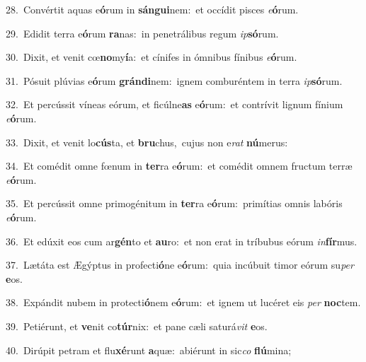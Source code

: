 {\numbfont\textcolor{\numbcolor}{28.}}~Convértit aquas e\-\textbf{ó}\-rum in \textbf{sán}\-\textbf{gui}nem:~\star et occídit pisces \textit{e}\-\textbf{ó}rum.\par
{\numbfont\textcolor{\numbcolor}{29.}}~Edidit terra e\-\textbf{ó}\-rum \textbf{ra}\-nas:~\star in penetrálibus regum \textit{ip}\-\textbf{só}rum.\par
{\numbfont\textcolor{\numbcolor}{30.}}~Dixit, et venit cœ\-\textbf{no}\-my\-\textbf{í}\-a:~\star et cínifes in ómnibus fínibus \textit{e}\-\textbf{ó}rum.\par
{\numbfont\textcolor{\numbcolor}{31.}}~Pósuit plúvias e\-\textbf{ó}\-rum \textbf{grán}\-\textbf{di}nem:~\star ignem comburéntem in terra \textit{ip}\-\textbf{só}rum.\par
{\numbfont\textcolor{\numbcolor}{32.}}~Et percússit víneas eórum, et ficúlne\textbf{as} e\-\textbf{ó}\-rum:~\star et contrívit lignum fínium \textit{e}\-\textbf{ó}rum.\par
{\numbfont\textcolor{\numbcolor}{33.}}~Dixit, et venit lo\-\textbf{cús}\-ta, et \textbf{bru}\-chus,~\star cujus non e\textit{rat} \textbf{nú}\-merus:\par
{\numbfont\textcolor{\numbcolor}{34.}}~Et comédit omne fœnum in \textbf{ter}\-ra e\-\textbf{ó}\-rum:~\star et comédit omnem fructum terræ \textit{e}\-\textbf{ó}rum.\par
{\numbfont\textcolor{\numbcolor}{35.}}~Et percússit omne primogénitum in \textbf{ter}\-ra e\-\textbf{ó}\-rum:~\star primítias omnis labóris \textit{e}\-\textbf{ó}rum.\par
{\numbfont\textcolor{\numbcolor}{36.}}~Et edúxit eos cum ar\-\textbf{gén}\-to et \textbf{au}\-ro:~\star et non erat in tríbubus eórum \textit{in}\-\textbf{fír}mus.\par
{\numbfont\textcolor{\numbcolor}{37.}}~Lætáta est Ægýptus in profecti\-\textbf{ó}\-ne e\-\textbf{ó}\-rum:~\star quia incúbuit timor eórum su\textit{per} \textbf{e}\-os.\par
{\numbfont\textcolor{\numbcolor}{38.}}~Expándit nubem in protecti\-\textbf{ó}\-nem e\-\textbf{ó}\-rum:~\star et ignem ut lucéret eis \textit{per} \textbf{noc}\-tem.\par
{\numbfont\textcolor{\numbcolor}{39.}}~Petiérunt, et \textbf{ve}\-nit co\-\textbf{túr}\-nix:~\star et pane cæli saturá\textit{vit} \textbf{e}\-os.\par
{\numbfont\textcolor{\numbcolor}{40.}}~Dirúpit petram et flu\-\textbf{xé}\-runt \textbf{a}\-quæ:~\star abiérunt in sic\textit{co} \textbf{flú}\-mina;\par
